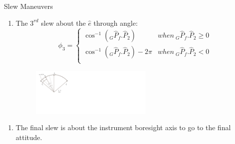 \documentclass{beamer}
\begin{document}
\begin{frame}
\begin{block}{Slew Maneuvers}
\begin{enumerate}[3]
\item The $3^{rd}$ slew about the $\hat{e}$ through angle:
 \begin{equation}
 \phi_3=\left\{
                \begin{array}{ll}
                  \cos^{-1}(_G\hat{P}_f.\hat{P}_2)& when\  _G\hat{P}_f.\hat{P}_2\geq 0\\
                 \cos^{-1}(_G\hat{P}_f.\hat{P}_2)-2\pi& when\ _G\hat{P}_f.\hat{P}_2<0\\
                \end{array}
              \right.
 \end{equation}
\begin{figure}
\includegraphics[width=2.3in]{./Figures/SVAS_4r}
\end{figure}
\end{enumerate}
\begin{enumerate}[4]
\item The final slew is about the instrument boresight axis to go to the final attitude. 
\end{enumerate}
\end{block}
\end{frame}
\end{document}
